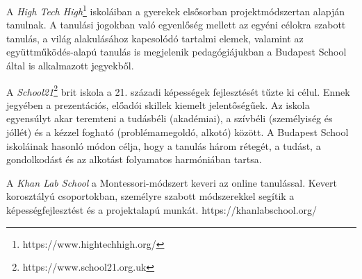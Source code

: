 A \emph{High Tech High}\footnote{https://www.hightechhigh.org/} iskoláiban a gyerekek elsősorban projektmódszertan alapján tanulnak. A tanulási jogokban való egyenlőség mellett az egyéni célokra szabott tanulás, a világ alakulásához kapcsolódó tartalmi elemek, valamint az együttműködés-alapú tanulás is megjelenik pedagógiájukban a Budapest School által is alkalmazott jegyekből.

A \emph{School21}\footnote{https://www.school21.org.uk} brit iskola a 21. századi képességek fejlesztését tűzte ki célul. Ennek jegyében a prezentációs, előadói skillek kiemelt jelentőségűek. Az iskola egyensúlyt akar teremteni a tudásbéli (akadémiai), a szívbéli (személyiség és jóllét) és a kézzel fogható (problémamegoldó, alkotó) között. A Budapest School iskoláinak hasonló módon célja, hogy a tanulás három rétegét, a tudást, a gondolkodást és az alkotást folyamatos harmóniában tartsa.\eject

A \emph{Khan Lab School} a Montessori-módszert keveri az online tanulással. Kevert korosztályú csoportokban, személyre szabott módszerekkel segítik a képességfejlesztést és a projektalapú munkát. https://khanlabschool.org/
